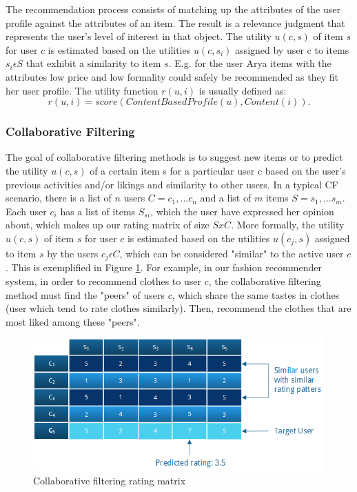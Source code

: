 The recommendation process consists of matching up the attributes of the user profile against the attributes of an item. The result is a relevance judgment that represents the user's level of interest in that object. The utility $u(c, s)$ of item $s$ for user $c$ is estimated based on the utilities $u(c, s_{i})$ assigned by user c to items $s_{i} \epsilon S$ that exhibit a similarity to item $s$. E.g. for the user Arya items with the attributes low price and low formality could safely be recommended as they fit her user profile. The utility function $r(u, i)$ is usually defined as:
\begin{equation}
r(u,i) = score(ContentBasedProfile(u), Content(i)).
\end{equation}

\subsubsection{Collaborative Filtering}

The goal of collaborative filtering methods is to suggest new items or to predict the utility $u(c, s)$ of a certain item s for a particular user c based on the user's previous activities and/or likings and similarity to other users. In a typical CF scenario, there is a list of $n$ users $C = {c_{1}, ... c_{n}}$ and a list of $m$ items $S = {s_{1},...s_{m}}$. Each user $c_{i}$ has a list of items $S_{si}$, which the user have expressed her opinion about, which makes up our rating matrix of size $SxC$. More formally, the utility $u(c, s)$ of item $s$ for user $c$ is estimated based on the utilities $u(c_{j}, s)$ assigned to item $s$ by the users $c_{j} \epsilon C$, which can be considered "similar" to the active user $c$. This is exemplified in Figure \ref{figure:ratingmatrix}. For example, in our fashion recommender system, in order to recommend clothes to user $c$, the collaborative filtering method must find the "peers" of users $c$, which share the same tastes in clothes (user which tend to rate clothes similarly). Then, recommend the clothes that are most liked among these "peers".

\begin{figure}[H]
    \includegraphics[width=5in]{image/ratingmatrix.png}
    \centering
    \caption[Collaborative filtering rating matrix]{Collaborative filtering rating matrix}
    \label{figure:ratingmatrix}
\end{figure}

